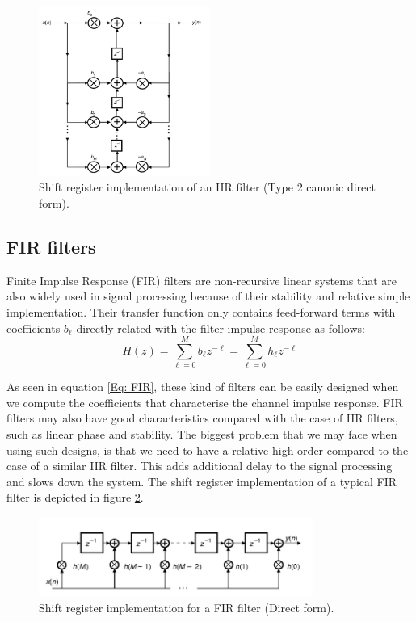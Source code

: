 \documentclass[12pt,a4paper,openright]{report}
\begin{document}
  \begin{figure}[H]
   \centering
     \includegraphics[width=0.5\textwidth]{IIRfilter.png}
     \caption[Shift register implementation of an IIR filter]{Shift register implementation of an IIR filter (Type 2 canonic direct form)\cite{DSPDiniz}.}
     \label{fig:IIRimpl}
 \end{figure}  

\subsection{FIR filters}
Finite Impulse Response (FIR) filters are non-recursive linear systems that are also widely used in signal processing because of their stability and relative simple implementation. Their transfer function only contains feed-forward terms with coefficients $b_\ell$ directly related with the filter impulse response as follows\cite{DSPDiniz}: 
\begin{equation}\label{Eq: FIR}
H\left( z \right) = \sum\limits_{\ell  = 0}^M {{b_\ell }{z^{ - \ell }}}=\sum\limits_{\ell  = 0}^M {{h_\ell }{z^{ - \ell }}}
\end{equation}

As seen in equation \ref{Eq: FIR}, these kind of filters can be easily designed when we compute the coefficients that characterise the channel impulse response. FIR filters may also have good characteristics compared with the case of IIR filters, such as linear phase and stability. The biggest problem that we may face when using such designs, is that we need to have a relative high order compared to the case of a similar IIR filter. This adds additional delay to the signal processing and slows down the system. The shift register implementation of a typical FIR filter is depicted in figure \ref{fig:FIRfilter}.
 
  \begin{figure}[H]
   \centering
     \includegraphics[width=0.8\textwidth]{FIRfilter.png}
     \caption[Shift register implementation for a FIR filter]{Shift register implementation for a FIR filter (Direct form)\cite{DSPDiniz}.}
     \label{fig:FIRfilter}
 \end{figure}  
\end{document}
